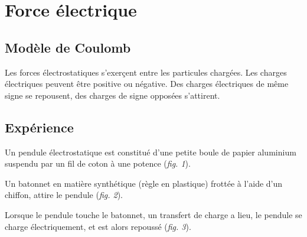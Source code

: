 
\section{Force électrique}
%
\subsection{Modèle de Coulomb}
Les forces électrostatiques s'exerçent entre les particules chargées. Les charges électriques peuvent être positive ou négative.
Des charges électriques de même signe se repousent, des charges de signe opposées s'attirent.

\subsection{Expérience}
Un pendule électrostatique est constitué d'une petite boule de papier aluminium suspendu par un fil de coton à une potence ({\it fig. 1}).
 
Un batonnet en matière synthétique (règle en plastique) frottée à l'aide d'un chiffon, attire le pendule ({\it fig. 2}).

Lorsque le pendule touche le batonnet, un transfert de charge a lieu, le pendule se charge électriquement, et est alors repoussé ({\it fig. 3}).

